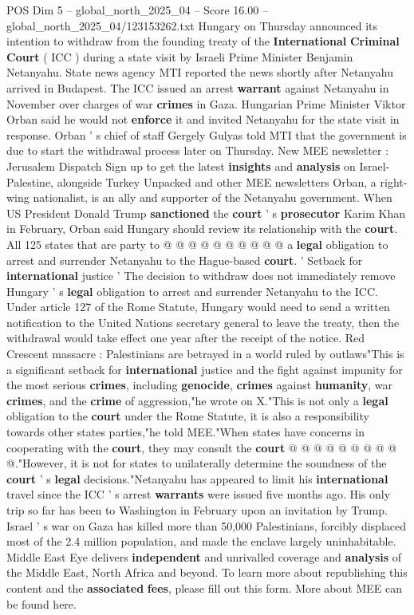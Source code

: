 \begin{textsample}{POS Dim 5 – global\_north\_2025\_04 – Score 16.00 – global\_north\_2025\_04/123153262.txt}  \label{ex:f5_pos_108}
Hungary on Thursday announced its intention to withdraw from the founding treaty of the \textbf{International} \textbf{Criminal} \textbf{Court} ( ICC ) during a state visit by Israeli Prime Minister Benjamin Netanyahu.
State news agency MTI reported the news shortly after Netanyahu arrived in Budapest.
The ICC issued an arrest \textbf{warrant} against Netanyahu in November over charges of war \textbf{crimes} in Gaza.
Hungarian Prime Minister Viktor Orban said he would not \textbf{enforce} it and invited Netanyahu for the state visit in response.
Orban ' s chief of staff Gergely Gulyas told MTI that the government is due to start the withdrawal process later on Thursday.
New MEE newsletter : Jerusalem Dispatch Sign up to get the latest \textbf{insights} and \textbf{analysis} on Israel-Palestine, alongside Turkey Unpacked and other MEE newsletters Orban, a right-wing nationalist, is an ally and supporter of the Netanyahu government.
When US President Donald Trump \textbf{sanctioned} the \textbf{court} ' s \textbf{prosecutor} Karim Khan in February, Orban said Hungary should review its relationship with the \textbf{court}.
All 125 states that are party to @ @ @ @ @ @ @ @ @ @ a \textbf{legal} obligation to arrest and surrender Netanyahu to the Hague-based \textbf{court}. ' Setback for \textbf{international} justice ' The decision to withdraw does not immediately remove Hungary ' s \textbf{legal} obligation to arrest and surrender Netanyahu to the ICC.
Under article 127 of the Rome Statute, Hungary would need to send a written notification to the United Nations secretary general to leave the treaty, then the withdrawal would take effect one year after the receipt of the notice.
Red Crescent massacre : Palestinians are betrayed in a world ruled by outlaws"This is a significant setback for \textbf{international} justice and the fight against impunity for the most serious \textbf{crimes}, including \textbf{genocide}, \textbf{crimes} against \textbf{humanity}, war \textbf{crimes}, and the \textbf{crime} of aggression,"he wrote on X."This is not only a \textbf{legal} obligation to the \textbf{court} under the Rome Statute, it is also a responsibility towards other states parties,"he told MEE."When states have concerns in cooperating with the \textbf{court}, they may consult the \textbf{court} @ @ @ @ @ @ @ @ @ @."However, it is not for states to unilaterally determine the soundness of the \textbf{court} ' s \textbf{legal} decisions."Netanyahu has appeared to limit his \textbf{international} travel since the ICC ' s arrest \textbf{warrants} were issued five months ago.
His only trip so far has been to Washington in February upon an invitation by Trump.
Israel ' s war on Gaza has killed more than 50,000 Palestinians, forcibly displaced most of the 2.4 million population, and made the enclave largely uninhabitable.
Middle East Eye delivers \textbf{independent} and unrivalled coverage and \textbf{analysis} of the Middle East, North Africa and beyond.
To learn more about republishing this content and the \textbf{associated} \textbf{fees}, please fill out this form.
More about MEE can be found here.


\end{textsample}
